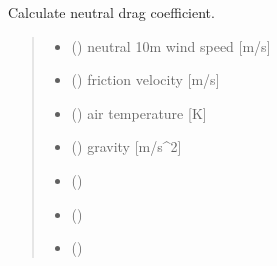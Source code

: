 \documentclass[letterpaper,10pt,english]{sphinxmanual}
\begin{document}

\begin{fulllineitems}
\label{\detokenize{users_guide:flux_subs.cdn_calc}}
\pysigstartsignatures
{}
\pysigstopsignatures
\sphinxAtStartPar
Calculate neutral drag coefficient.
\begin{quote}\begin{description}
\begin{itemize}
\item {} 
\sphinxAtStartPar
{} () \textendash{} neutral 10m wind speed {[}m/s{]}

\item {} 
\sphinxAtStartPar
{} () \textendash{} friction velocity      {[}m/s{]}

\item {} 
\sphinxAtStartPar
{} () \textendash{} air temperature        {[}K{]}

\item {} 
\sphinxAtStartPar
{} () \textendash{} gravity               {[}m/s\textasciicircum{}2{]}

\item {} 
\sphinxAtStartPar
{} () \textendash{} 

\end{itemize}

\sphinxAtStartPar
\begin{itemize}
\item {} 
\sphinxAtStartPar
{} ()

\item {} 
\sphinxAtStartPar
{} ()

\end{itemize}


\end{description}\end{quote}

\end{fulllineitems}
\end{document}
